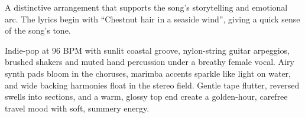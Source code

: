 

\begin{notes}
A distinctive arrangement that supports the song's storytelling and emotional arc. %
The lyrics begin with “Chestnut hair in a seaside wind”, giving a quick sense of the song’s tone.
\end{notes}

\begin{style}
Indie-pop at 96 BPM with sunlit coastal groove, nylon-string guitar arpeggios, brushed shakers and muted hand percussion under a breathy female vocal. %
Airy synth pads bloom in the choruses, marimba accents sparkle like light on water, and wide backing harmonies float in the stereo field. %
Gentle tape flutter, reversed swells into sections, and a warm, glossy top end create a golden-hour, carefree travel mood with soft, summery energy.
\end{style}

